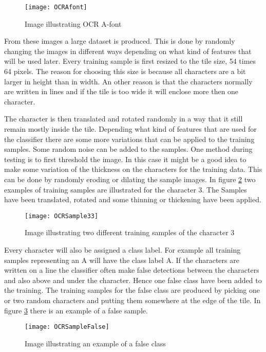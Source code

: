 \begin{figure}[H]
\centering
	\texttt{[image: OCRAfont]}
	\caption{Image illustrating OCR A-font}
	\label{Afont}
\end{figure}

From these images a large dataset is produced. This is done by randomly changing the images in different ways depending on what kind of features that will be used later. Every training sample is first resized to the tile size, 54 times 64 pixels. The reason for choosing this size is because all characters are a bit larger in height than in width. An other reason is that the characters normally are written in lines and if the tile is too wide it will enclose more then one character. 

The character is then translated  and rotated randomly  in a way that it still remain mostly inside the tile. Depending what kind of features that are used for the classifier there are some more variations that can be applied to the training samples. Some random noise can be added to the samples. One method during testing is to first threshold the image. In this case it might be a good idea to make some variation of the thickness on the characters for the training data. This can be done by randomly eroding or dilating the sample images. In figure \ref{OCRSample3} two examples of training samples are illustrated for the character 3. The Samples have been translated, rotated and some thinning or thickening have been applied.

\begin{figure}[H]
\centering
	\texttt{[image: OCRSample33]}
	\caption{Image illustrating two different training samples of the character 3}
	\label{OCRSample3}
\end{figure}

Every character will also be assigned a class label. For example all training samples representing an A will have the class label A. If the characters are written on a line the classifier often make false detections between the characters and also above and under the character. Hence one false class have been added to the training. The training samples for the false class are produced by picking one or two random characters and putting them somewhere at the edge of the tile. In figure \ref{OCRSampleFalse} there is an example of a false sample.

\begin{figure}[H]
\centering
	\texttt{[image: OCRSampleFalse]}
	\caption{Image illustrating an example of a false class}
	\label{OCRSampleFalse}
\end{figure}

